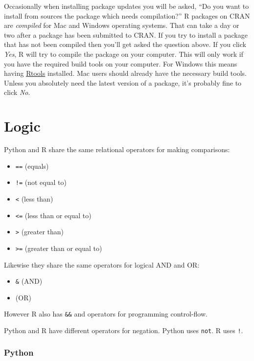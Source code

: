 \documentclass[
]{book}
\providecommand{\tightlist}{%
  \setlength{\itemsep}{0pt}\setlength{\parskip}{0pt}}
\begin{document}
Occasionally when installing package updates you will be asked, ``Do you want to install from sources the package which needs compilation?'' R packages on CRAN are \emph{compiled} for Mac and Windows operating systems. That can take a day or two after a package has been submitted to CRAN. If you try to install a package that has not been compiled then you'll get asked the question above. If you click \emph{Yes}, R will try to compile the package on your computer. This will only work if you have the required build tools on your computer. For Windows this means having \href{https://cran.r-project.org/bin/windows/Rtools/}{Rtools} installed. Mac users should already have the necessary build tools. Unless you absolutely need the latest version of a package, it's probably fine to click \emph{No}.

\hypertarget{logic}{%
\section{Logic}\label{logic}}

Python and R share the same relational operators for making comparisons:

\begin{itemize}
\tightlist
\item
  \texttt{==} (equals)
\item
  \texttt{!=} (not equal to)
\item
  \texttt{\textless{}} (less than)
\item
  \texttt{\textless{}=} (less than or equal to)
\item
  \texttt{\textgreater{}} (greater than)
\item
  \texttt{\textgreater{}=} (greater than or equal to)
\end{itemize}

Likewise they share the same operators for logical AND and OR:

\begin{itemize}
\tightlist
\item
  \texttt{\&} (AND)
\item
  \texttt{\textbar{}} (OR)
\end{itemize}

However R also has \texttt{\&\&} and \texttt{\textbar{}\textbar{}} operators for programming control-flow.

Python and R have different operators for negation. Python uses \texttt{not}. R uses \texttt{!}.

\hypertarget{python-4}{%
\subsubsection*{Python}\label{python-4}}
\end{document}
